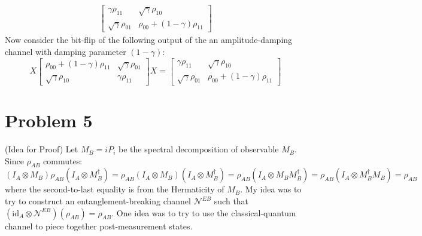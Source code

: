 \documentclass[12pt]{article}%
\begin{document}
\begin{enumerate}
\begin{gather*}
    \left[\begin{matrix} \gamma\rho_{11} & \sqrt{\gamma}\rho_{10} \\
      \sqrt{\gamma}\rho_{01} & \rho_{00} + (1-\gamma)\rho_{11}
     \end{matrix}\right]
  \end{gather*}
  Now consider the bit-flip of the following output of the an amplitude-damping channel with damping parameter $(1 - \gamma)$:
  $$ X\left[\begin{matrix} \rho_{00} + (1 - \gamma)\rho_{11} & \sqrt{\gamma} \rho_{01} \\ \sqrt{\gamma} \rho_{10} & \gamma\rho_{11} \end{matrix}\right]X =  \left[\begin{matrix}  \gamma\rho_{11}& \sqrt{\gamma} \rho_{10} \\ \sqrt{\gamma} \rho_{01} & \rho_{00} + (1 - \gamma)\rho_{11} \end{matrix}\right]$$
\end{enumerate}

\section*{Problem 5}
(Idea for Proof)
Let $M_B = iP_i$ be the spectral decomposition of observable $M_B$. Since $\rho_{AB}$ commutes:
$$(I_A \otimes M_B)\rho_{AB}(I_A \otimes M_B^\dagger) =  \rho_{AB}(I_A \otimes M_B)(I_A \otimes M_B^\dagger) = \rho_{AB}(I_A \otimes M_BM_B^\dagger) = \rho_{AB}(I_A \otimes M_B^\dagger M_B) = \rho_{AB}$$
where the second-to-last equality is from the Hermaticity of $M_B$. \newline \newline
My idea was to try to construct an entanglement-breaking channel $\mathcal{N}^{EB}$  such that $(\text{id}_A \otimes  \mathcal{N}^{EB})(\rho_{AB}) = \rho_{AB}$. One idea was to try to use  the classical-quantum channel to piece together post-measurement states.
\end{document}
